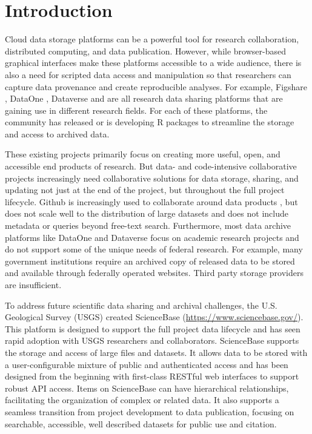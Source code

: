 \section{Introduction}

Cloud data storage platforms can be a powerful tool for research collaboration,
distributed computing, and data publication. However, while browser-based graphical
interfaces make these platforms accessible to a wide audience, there is also
a need for scripted data access and manipulation so that researchers can capture 
data provenance and create reproducible analyses. For example,
Figshare , DataOne , Dataverse  
and  are all research data
sharing platforms that are gaining use in different research fields. For each of these
platforms, the community has released \citep{rfigshare, dvn, ckanr} or is
developing \citep{dataone} R packages to streamline the storage and access
to archived data. 

These existing projects primarily focus on creating more useful, open, and
accessible end products of research. But data- and code-intensive collaborative projects
increasingly need collaborative solutions for data storage, sharing, and updating
not just at the end of the project, but throughout the full project lifecycle. 
Github is increasingly used to collaborate around data products \citep{GandrudGithub}, 
but does not scale well to the distribution of large datasets \citep{Delcambre2013} and does not
include metadata or queries beyond free-text search. Furthermore, 
most data archive platforms like DataOne and Dataverse 
focus on academic research projects and do not support some
of the unique needs of federal research. For example, many government institutions
require an archived copy of released data to be stored and available through federally
operated websites. Third party storage providers are insufficient.

To address future scientific data sharing and archival challenges, the U.S. 
Geological Survey (USGS) created ScienceBase (\url{https://www.sciencebase.gov/}). 
This platform is designed to support the full project data lifecycle and has seen 
rapid adoption with USGS researchers and collaborators. ScienceBase supports the 
storage and access of large files and datasets. It allows data to be stored 
with a user-configurable mixture of 
public and authenticated access and has been designed from the beginning with
first-class RESTful web interfaces to support robust API access. Items on ScienceBase 
can have hierarchical relationships, facilitating the organization of complex or related
data. It also supports a seamless transition from project development to data publication, 
focusing on searchable, accessible, well described datasets for public use and citation.

